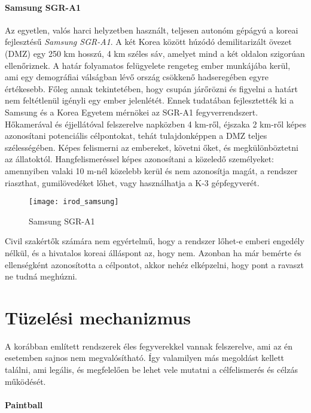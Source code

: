 \paragraph{Samsung SGR-A1 \cite{samsung}}
Az egyetlen, valós harci helyzetben használt, teljesen autonóm gépágyú a koreai fejlesztésű \textsl{Samsung SGR-A1}. A két Korea között húzódó demilitarizált övezet (DMZ) egy 250 km hosszú, 4 km széles sáv, amelyet mind a két oldalon szigorúan ellenőriznek. A határ folyamatos felügyelete rengeteg ember munkájába kerül, ami egy demográfiai válságban lévő ország csökkenő hadseregében egyre értékesebb. Főleg annak tekintetében, hogy csupán járőrözni és figyelni a határt nem feltétlenül igényli egy ember jelenlétét. Ennek tudatában fejlesztették ki a Samsung és a Korea Egyetem mérnökei az SGR-A1 fegyverrendszert. Hőkamerával és éjjellátóval felszerelve napközben 4 km-ről, éjszaka 2 km-ről képes azonosítani potenciális célpontokat, tehát tulajdonképpen a DMZ teljes szélességében. Képes felismerni az embereket, követni őket, és megkülönböztetni az állatoktól. Hangfelismeréssel képes azonosítani a közeledő személyeket: amennyiben valaki 10 m-nél közelebb kerül és nem azonosítja magát, a rendszer riaszthat, gumilövedéket lőhet, vagy használhatja a K-3 gépfegyverét.

\begin{figure}[h!]
	\centering
	\texttt{[image: irod\_samsung]}
	\caption{Samsung SGR-A1 \cite{samsung}}
	\label{fig:irod_samsung}
\end{figure}

Civil szakértők számára nem egyértelmű, hogy a rendszer lőhet-e emberi engedély nélkül, és a hivatalos koreai álláspont az, hogy nem. Azonban ha már bemérte és ellenségként azonosította a célpontot, akkor nehéz elképzelni, hogy pont a ravaszt ne tudná meghúzni.

\pagebreak

\section{Tüzelési mechanizmus}

A korábban említett rendszerek éles fegyverekkel vannak felszerelve, ami az én esetemben sajnos nem megvalósítható. Így valamilyen más megoldást kellett találni, ami legális, és megfelelően be lehet vele mutatni a célfelismerés és célzás működését. 


\paragraph{Paintball \cite{paintball}}

